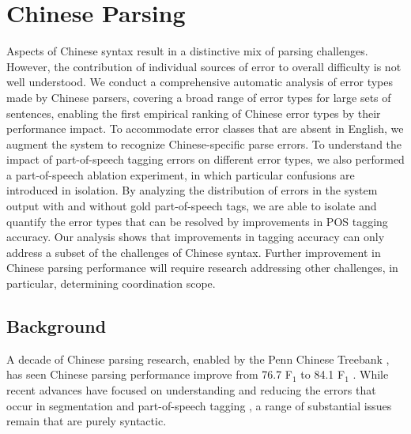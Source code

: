 \section{Chinese Parsing}

Aspects of Chinese syntax result in a distinctive mix of parsing challenges.
However, the contribution of individual sources of error to overall difficulty is not well understood.  
We conduct a comprehensive automatic analysis of error types made by Chinese parsers, covering a broad range of error types for large sets of sentences, enabling the first empirical ranking of Chinese error types by their performance impact.  
To accommodate error classes that are absent in English, we augment the system to recognize Chinese-specific parse errors.
To understand the impact of part-of-speech tagging errors on different error types, we also performed a part-of-speech ablation experiment, in which particular confusions are introduced in isolation.
By analyzing the distribution of errors in the system output with and without gold part-of-speech tags, we are able to isolate and quantify the error types that can be resolved by improvements in POS tagging accuracy.
Our analysis shows that improvements in tagging accuracy can only address a subset of the challenges of Chinese syntax.
Further improvement in Chinese parsing performance will require research addressing other challenges, in particular, determining coordination scope.

\subsection{Background}

A decade of Chinese parsing research, enabled by the Penn Chinese Treebank \parencite[\pctb;][]{Xue:2005:NLE}, has seen Chinese parsing performance improve from 76.7 F$_1$ \parencite{Bikel-Chiang:2000:CLP} to 84.1 F$_1$ \parencite{Qian-Liu:2012:EMNLP}.
While recent advances have focused on understanding and reducing the errors that occur in segmentation and part-of-speech tagging \parencite{Qian-Liu:2012:EMNLP,Jiang-etal:2009:ACL,Forst-Fang:2009:EACL}, a range of substantial issues remain that are purely syntactic.

